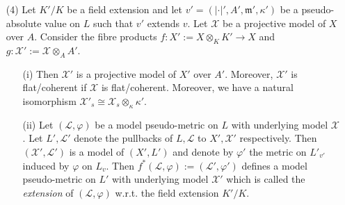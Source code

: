 \documentclass [11pt,reqno]{amsart}
\newcommand{\1}{\mathmybb{1}}
\def\cL{{\mathcal{L}}}
\def\cX{{\mathcal{X}}}
\def\cY{{\mathcal{Y}}}
\def\m{\mathfrak m}
\def\tilde{\widetilde}
\newcommand{\va}{|\cdot|}
\begin{document}
\begin{proposition-definition}
\begin{itemize}
Let $L$ be a line bundle on $X$. Let $(\cL,\varphi)$ be a model pseudo-metric on $L$ with underlying model $\cX$. Then $(g^{\ast}\cL,\tilde{g}^{\ast}\varphi)$ is a model pseudo-metric on $L$ with underlying model $\cY$. By abuse of notation, we denote this model pseudo-metric by $g^{\ast}(\cL,\varphi)$ and $\tilde{g}^{\ast}\varphi$ by $g^{\ast}\varphi$. $g^{\ast}(\cL,\varphi)$ is called the \emph{pullback} of $(\cL,\varphi)$ w.r.t. the morphism $g : \cY \to \cX$. Moreover, $g^{\ast}(\cL,\varphi)$ is continuous/usc/lsc if $\varphi$ is continuous/usc/lsc. 
	\item[(4)] Let $K'/K$ be a field extension and let $v'=(\va',A',\m',\kappa')$ be a pseudo-absolute value on $L$ such that $v'$ extends $v$. Let $\cX$ be a projective model of $X$ over $A$. Consider the fibre products $f : X' := X \otimes_K K' \to X$ and $g:\cX':=\cX \otimes_{A} A'$. 
	\begin{itemize}
		\item[(i)] Then $\cX'$ is a projective model of $X'$ over $A'$. Moreover, $\cX'$ is flat/coherent if $\cX$ is flat/coherent. Moreover, we have a natural isomorphism $\cX'_s \cong \cX_{s} \otimes_{\kappa} \kappa'$.
		\item[(ii)] Let $(\cL,\varphi)$ be a model pseudo-metric on $L$ with underlying model $\cX$. Let $L',\cL'$ denote the pullbacks of $L,\cL$ to $X',\cX'$ respectively. Then $(\cX',\cL')$ is a model of $(X',L')$ and denote by $\varphi'$ the metric on $L'_{v'}$ induced by $\varphi$ on $L_v$. Then $f^{\ast}(\cL,\varphi) := (\cL',\varphi')$ defines a model pseudo-metric on $L'$ with underlying model $\cX'$ which is called the \emph{extension} of $(\cL,\varphi)$ w.r.t. the field extension $K'/K$.
\end{itemize}		
\end{itemize}
\end{proposition-definition}
\end{document}
